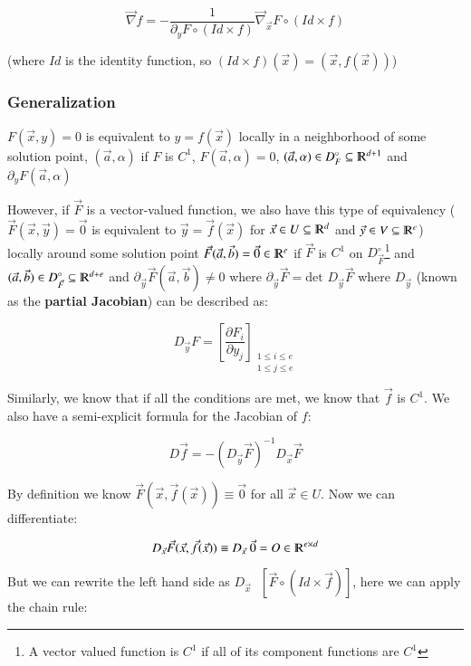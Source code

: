 \documentclass [12 pt, twoside] {book}
\newcommand\+{\text{ }}
\newcommand{\gradient}{\vec{\nabla}}
\newcommand{\det}{\text{det }}
\begin{document}
$$\boxed{\gradient f = -\frac{1}{\partial_y F \circ (Id \times f)} \gradient_{\vec{x}}
F \circ (Id \times f)}$$

(where $Id$ is the identity function, so $(Id \times f)(\vec{x}) = (\vec{x},
f(\vec{x}))$)

\subsubsection{Generalization}

$F(\vec{x}, y) = 0$ is equivalent to $y = f(\vec{x})$ locally in a neighborhood
of some solution point, $(\vec{a}, \alpha)$ if $F$ is $C^1$, $F(\vec{a}, \alpha) = 0$,
$(\vec{a}, \alpha) \in D_F^\circ \subseteq \varmathbb{R}^{d + 1}$ and
$\partial_y F(\vec{a}, \alpha)$

However, if $\vec{F}$ is a vector-valued function, we also have this type of
equivalency ($\vec{F}(\vec{x}, \vec{y}) = \vec{0}$ is equivalent to $\vec{y} =
\vec{f}(\vec{x})$ for $\vec{x} \in U \subseteq \varmathbb{R}^d$ and $\vec{y} \in
V \subseteq \varmathbb{R}^e$) locally around some solution point $\vec{F}(\vec{a}, \vec{b})
= \vec{0} \in \varmathbb{R}^e$ if $\vec{F}$ is $C^1$ on $D_{\vec{F}}^\circ$\footnote{A vector valued
function is $C^1$ if all of its component functions are $C^1$} and $(\vec{a},
\vec{b}) \in D_{\vec{F}}^\circ \subseteq \varmathbb{R}^{d + e}$ and
$\partial_{\vec{y}} \vec{F}(\vec{a}, \vec{b}) \neq 0$ where $\partial_{\vec{y}}
\vec{F} = \det D_{\vec{y}} \vec{F}$ where $D_{\vec{y}}$ (known as the
\textbf{partial Jacobian}) can be described as:

$$D_{\vec{y}} F = \left[\frac{\partial F_i}{\partial y_j}\right]_{\substack{1 \leq i \leq
e \\ 1 \leq j \leq e}}$$

Similarly, we know that if all the conditions are met, we know that $\vec{f}$ is
$C^1$. We also have a semi-explicit formula for the Jacobian of $f$:

$$\boxed{D\vec{f} = -(D_{\vec{y}} \vec{F})^{-1} D_{\vec{x}} \vec{F}}$$

By
definition we know $\vec{F}(\vec{x}, \vec{f}(\vec{x})) \equiv \vec{0}$ for all
$\vec{x} \in U$. Now we can differentiate:

$$D_{\vec{x}} \vec{F}(\vec{x}, \vec{f}(\vec{x})) \equiv D_{\vec{x}} \+ \vec{0} = O
\in \varmathbb{R}^{e \times d}$$

But we can rewrite the left hand side as $D_{\vec{x}} \+ [\vec{F} \circ (Id
\times \vec{f})]$, here we can apply the chain rule:
\end{document}
